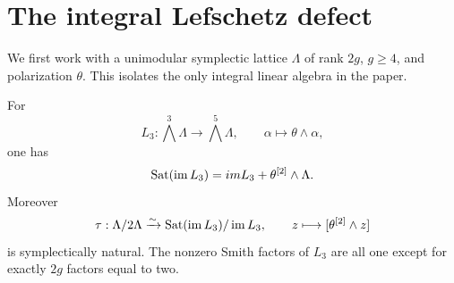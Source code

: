 \section{The integral Lefschetz defect}\label{sec:lattice}

We first work with a unimodular symplectic lattice \(\Lambda\) of rank
\(2g\), \(g\geq4\), and polarization \(\theta\).  This isolates the only
integral linear algebra in the paper.

\begin{theorem}\label{thm:symplectic-saturation}
For
\[
 L_3:\bigwedge^3\Lambda\longrightarrow\bigwedge^5\Lambda,
 \qquad \alpha\longmapsto\theta\wedge\alpha,
\]
one has
\begin{equation}\label{eq:general-saturation}
 \operatorname{Sat}(\operatorname{im} L_3)=im L_3+\theta^{[2]}\wedge\Lambda.
\end{equation}
Moreover
\begin{equation}\label{eq:tau-isomorphism}
 \tau:\Lambda/2\Lambda\xrightarrow{\sim}
 \operatorname{Sat}(\operatorname{im} L_3)/\operatorname{im} L_3,
 \qquad z\longmapsto[\theta^{[2]}\wedge z]
\end{equation}
is symplectically natural.  The nonzero Smith factors of \(L_3\) are all
one except for exactly \(2g\) factors equal to two.
\end{theorem}


